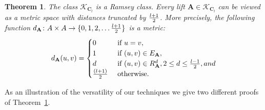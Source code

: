 \documentclass{elsarticle}
\def\str#1{\mathbf {#1}}
\def\nbrel#1#2{R\ifstrempty{#1}{}{_{#1}}\ifstrempty{#2}{}{^{#2}}}
\def\K{{\mathcal K}}
\theoremstyle{plain}
\newtheorem{theorem}{Theorem}[section]
\theoremstyle{definition}
\theoremstyle{remark}
\begin{document}
\begin{theorem}
\label{thm:kcycle}
The class $\K_{\str C_l}$ is a Ramsey class. Every lift $\str{A}\in \K_{\str C_l}$ can be viewed as a metric space with distances truncated by $l+1\over 2$. 
More precisely, the following function $d_{\str{A}}\colon A\times A\to \{0,1,2,\ldots {l+1\over 2}\}$ is a metric:
$$d_{\str{A}}(u,v)=
\begin{cases}
0&\hbox{ if }u=v,\\
1&\hbox{ if }(u,v)\in E_{\str{A}},\\
d&\hbox{ if }(u,v)\in \nbrel{\str{A}}{d}, 2\leq d\leq {l-1\over 2}, and\\
{(l+1)\over 2}&\hbox{ otherwise.}
\end{cases}$$
\end{theorem}
As an illustration of the versatility of our techniques we give two different proofs of Theorem~\ref{thm:kcycle}.
\end{document}
